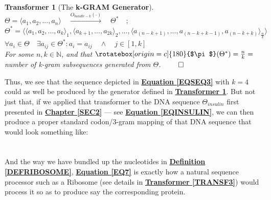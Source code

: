 \documentclass[a4paper, 18pt]{book} %
\newtheorem{transf}{Transformer}
\newcommand{\invpi}{\rotatebox[origin=c]{180}{$\pi$}}
\begin{document}
\vspace{1em}

\begin{transf}[The \textbf{k-GRAM Generator}]
\label{TRANSFBUND}
$\Theta = \langle a_1, a_2,...,a_n\rangle \quad \xrightarrow{O_{bundle-k}(\cdot)} \quad \Theta^* \quad;$\\
$\Theta^* = \langle \langle a_1, a_2,..., a_k \rangle_1, \langle a_{k+1},...,a_{2k} \rangle_2,... , \langle a_{(n-k+1)},...,a_{(n-k+k-1)},a_{(n-k+k)}\rangle_{\frac{n}{k}} \rangle$\\
$\forall a_i \in \Theta \quad \exists a_{ij} \in \Theta^*: a_i = a_{ij} \quad \land \quad j \in [1,k]$\\
For some $n, k \in \mathbb{N}$, and that $\invpi(\Theta^*) = \frac{n}{k} = $ number of k-gram subsequences generated from $\Theta$. $\qed$
\end{transf}

\vspace{1em}


Thus, we see that the sequence depicted in \textbf{\hyperref[EQSEQ3]{Equation \ref{EQSEQ3}}} with $k=4$ could as well be produced by the generator defined in \textbf{\hyperref[TRANSFBUND]{Transformer \ref{TRANSFBUND}}}. But not just that, if we applied that transformer to the DNA sequence $\Theta_{insulin}$ first presented in \textbf{\hyperref[SEC2]{Chapter \ref{SEC2}}} --- see \textbf{\hyperref[EQINSULIN]{Equation \ref{EQINSULIN}}}, we can then produce a proper standard codon/3-gram mapping of that DNA sequence that would look something like:\\


\\\\

And the way we have bundled up the nucleotides in \textbf{\hyperref[DEFRIBOSOME]{Definition \ref{DEFRIBOSOME}}}, \textbf{\hyperref[EQ7]{Equation \ref{EQ7}}} is exactly how a natural sequence processor such as a Ribosome (see details in \textbf{\hyperref[TRANSF3]{Transformer \ref{TRANSF3}}}) would process it so as to produce say the corresponding protein.
\end{document}
